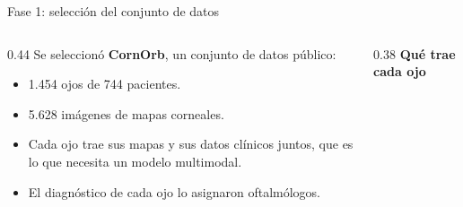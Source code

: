 

\begin{frame}{Fase 1: selección del conjunto de datos}
    \begin{columns}[c, totalwidth=0.95\textwidth]
        \hspace*{0.07\textwidth}
        \begin{column}{0.44\textwidth}
            Se seleccionó \textbf{CornOrb}, un conjunto de datos público:
            \begin{itemize}
                \item 1.454 ojos de 744 pacientes.
                \item 5.628 imágenes de mapas corneales.
                \item Cada ojo trae sus mapas y sus datos clínicos juntos, que es lo que necesita un modelo multimodal.
                \item El diagnóstico de cada ojo lo asignaron oftalmólogos.
            \end{itemize}
        \end{column}
        \hspace{0.04\textwidth}
        \begin{column}{0.38\textwidth}
            \centering
            {\small\textbf{Qué trae cada ojo}}\par\vspace{0.2cm}
        \end{column}
    \end{columns}
\end{frame}


